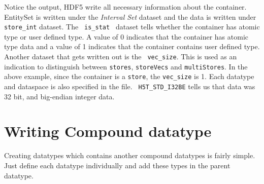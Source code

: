 \par Notice the output, HDF5 write all necessary information about the
container. EntitySet is written under the {\em Interval Set} dataset
and the data is written under {\tt store_int} dataset. The {\tt
  is\_stat } dataset tells whether the container has atomic type or
user defined type. A value of 0 indicates that the container has atomic 
type data and a value of 1 indicates that the container contains user
defined type. Another dataset that gets written out is the {\tt
  vec\_size}. This is used as an indication to distinguish between
{\tt stores}, {\tt storeVecs} and {\tt multiStores}. In the above
example, since the container is a {\tt store}, the {\tt vec\_size} is
1. Each datatype and dataspace is also specified in the file. {\tt
  H5T\_STD\_I32BE} tells us that data was 32 bit, and big-endian
integer data.   
%
\section { Writing Compound datatype}
Creating datatypes which contains another compound datatypes is fairly
simple. Just define each datatype individually and add these types in 
the parent datatype.

